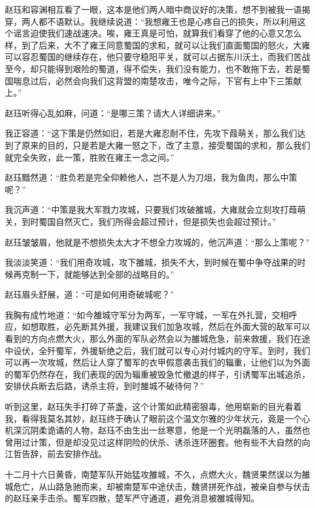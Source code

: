 赵珏和容渊相互看了一眼，这本是他们两人暗中商议好的决策，想不到被我一语揭穿，两人都不语默认。我继续说道：“我想雍王也是心疼自己的损失，所以利用这个谣言迫使我们速战速决。唉，雍王真是可怕，就算我们看穿了他的心意又怎么样，到了后来，大不了雍王同意蜀国的求和，就可以让我们直面蜀国的怒火，大雍可以容忍蜀国的继续存在，他只要守稳阳平关，就可以占据东川沃土，而我们苦战至今，却只能得到艰险的蜀道，得不偿失，我们没有能力，也不敢拖下去，若是蜀国喘息过后，必然会向我们这背盟的南楚攻击，唯今之际，下官有上中下三策献上。”

赵珏听得心乱如麻，问道：“是哪三策？请大人详细讲来。”

我正容道：“这下策是仍然如旧，若是大雍忍耐不住，先攻下葭萌关，那么我们达到了原来的目的，只是若是大雍一怒之下，改了主意，接受蜀国的求和，那么我们就完全失败，此一策，胜败在雍王一念之间。”

赵珏黯然道：“胜负若是完全仰赖他人，岂不是人为刀俎，我为鱼肉，那么中策呢？”

我沉声道：“中策是我大军戮力攻城，只要我们攻破雒城，大雍就会立刻攻打葭萌关，到时蜀国自然灭亡，我们所得会超过预计，但是损失也会超过预计。”

赵珏皱皱眉，他就是不想损失太大才不想全力攻城的，他沉声道：“那么上策呢？”

我淡淡笑道：“我们用奇攻城，攻下雒城，损失不大，到时候在蜀中争夺战果的时候再克制一下，就能够达到全部的战略目的。”

赵珏眉头舒展，道：“可是如何用奇破城呢？”

我胸有成竹地道：“如今雒城守军分为两军，一军守城，一军在外扎营，交相呼应，如想取胜，必先断其外援，我建议我们加急攻城，然后在外面大营的敌军可以看到的方向点燃大火，那么外面的军队必然会以为雒城危急，前来救援，我们在途中设伏，全歼蜀军，外援斩绝之后，我们就可以专心对付城内的守军。到时，我们可以再一次攻城，然后让人穿了蜀军的衣甲假意袭击我们的辎重，让他们以为外面的蜀军仍然存在，我们表现的因为辎重被毁急忙撤退的样子，引诱蜀军出城追杀，安排伏兵断去后路，诱杀主将，到时雒城不破待何？”

听到这里，赵珏失手打碎了茶盏，这个计策如此精密狠毒，他用崭新的目光看着我，看得我莫名其妙，赵珏终于确认了眼前这个温文尔雅的少年状元，竟是一个心机深沉阴柔诡谲的人物，赵珏不由生出一丝寒意，他是一个光明磊落的人，虽然也曾用过计策，但是却没见过这样阴险的伏杀、诱杀连环圈套。他有些不大自然的向江哲告辞，前去安排作战。

十二月十六日黄昏，南楚军队开始猛攻雒城，不久，点燃大火，魏贤果然误以为雒城危亡，从山路急驰而来，却被南楚军中途伏击，魏贤拼死作战，被亲自参与伏击的赵珏亲手击杀。蜀军四散，楚军严守通道，避免消息被雒城得知。

